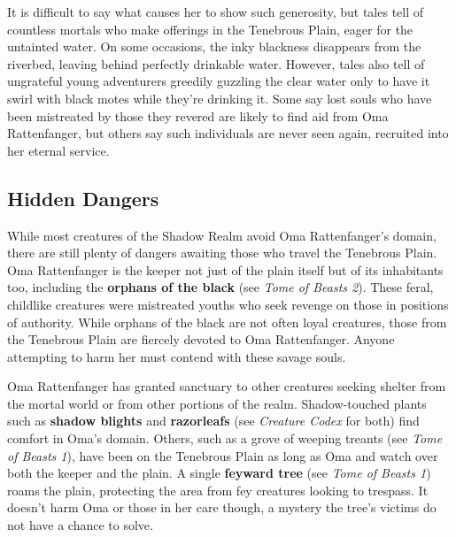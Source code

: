 \documentclass[10pt,a4paper,twoside,bg=print,twocolumn,openany,nodeprecatedcode]{dndbook}
\begin{document}
It is difficult to say what causes her to show such generosity, but tales tell of countless mortals who make offerings in the Tenebrous Plain, eager for the untainted water. On some occasions, the inky blackness disappears from the riverbed, leaving behind perfectly drinkable water. However, tales also tell of ungrateful young adventurers greedily guzzling the clear water only to have it swirl with black motes while they're drinking it. Some say lost souls who have been mistreated by those they revered are likely to find aid from Oma Rattenfanger, but others say such individuals are never seen again, recruited into her eternal service.

\subsection{Hidden Dangers}
While most creatures of the Shadow Realm avoid Oma Rattenfanger's domain, there are still plenty of dangers awaiting those who travel the Tenebrous Plain. Oma Rattenfanger is the keeper not just of the plain itself but of its inhabitants too, including the \textbf{orphans of the black} (see \textit{Tome of Beasts 2}). These feral, childlike creatures were mistreated youths who seek revenge on those in positions of authority. While orphans of the black are not often loyal creatures, those from the Tenebrous Plain are fiercely devoted to Oma Rattenfanger. Anyone attempting to harm her must contend with these savage souls.

Oma Rattenfanger has granted sanctuary to other creatures seeking shelter from the mortal world or from other portions of the realm. Shadow-touched plants such as \textbf{shadow blights} and \textbf{razorleafs} (see \textit{Creature Codex} for both) find comfort in Oma's domain. Others, such as a grove of weeping treants (see \textit{Tome of Beasts 1}), have been on the Tenebrous Plain as long as Oma and watch over both the keeper and the plain. A single \textbf{feyward tree} (see \textit{Tome of Beasts 1}) roams the plain, protecting the area from fey creatures looking to trespass. It doesn't harm Oma or those in her care though, a mystery the tree's victims do not have a chance to solve.
\end{document}
